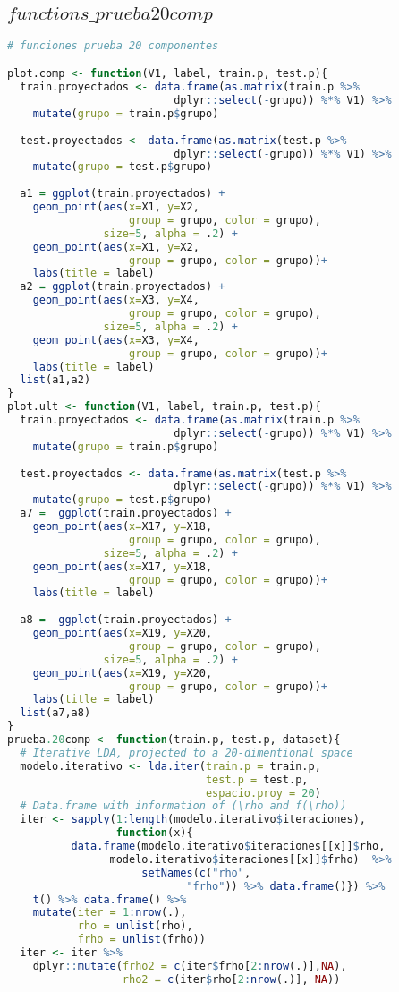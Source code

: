 \subsection{$functions\_prueba20comp$}
\begin{lstlisting}[language=R, basicstyle=\small]
# funciones prueba 20 componentes

plot.comp <- function(V1, label, train.p, test.p){
  train.proyectados <- data.frame(as.matrix(train.p %>% 
                          dplyr::select(-grupo)) %*% V1) %>%
    mutate(grupo = train.p$grupo)
  
  test.proyectados <- data.frame(as.matrix(test.p %>% 
                          dplyr::select(-grupo)) %*% V1) %>%
    mutate(grupo = test.p$grupo)
  
  a1 = ggplot(train.proyectados) + 
    geom_point(aes(x=X1, y=X2, 
                   group = grupo, color = grupo), 
               size=5, alpha = .2) + 
    geom_point(aes(x=X1, y=X2, 
                   group = grupo, color = grupo))+ 
    labs(title = label)
  a2 = ggplot(train.proyectados) + 
    geom_point(aes(x=X3, y=X4, 
                   group = grupo, color = grupo), 
               size=5, alpha = .2) + 
    geom_point(aes(x=X3, y=X4, 
                   group = grupo, color = grupo))+ 
    labs(title = label)
  list(a1,a2)
}
plot.ult <- function(V1, label, train.p, test.p){
  train.proyectados <- data.frame(as.matrix(train.p %>% 
                          dplyr::select(-grupo)) %*% V1) %>%
    mutate(grupo = train.p$grupo)
  
  test.proyectados <- data.frame(as.matrix(test.p %>% 
                          dplyr::select(-grupo)) %*% V1) %>%
    mutate(grupo = test.p$grupo)
  a7 =  ggplot(train.proyectados) + 
    geom_point(aes(x=X17, y=X18, 
                   group = grupo, color = grupo), 
               size=5, alpha = .2) + 
    geom_point(aes(x=X17, y=X18, 
                   group = grupo, color = grupo))+ 
    labs(title = label)
  
  a8 =  ggplot(train.proyectados) + 
    geom_point(aes(x=X19, y=X20, 
                   group = grupo, color = grupo), 
               size=5, alpha = .2) + 
    geom_point(aes(x=X19, y=X20, 
                   group = grupo, color = grupo))+ 
    labs(title = label)
  list(a7,a8)
}
prueba.20comp <- function(train.p, test.p, dataset){
  # Iterative LDA, projected to a 20-dimentional space
  modelo.iterativo <- lda.iter(train.p = train.p, 
                               test.p = test.p,
                               espacio.proy = 20)
  # Data.frame with information of (\rho and f(\rho))
  iter <- sapply(1:length(modelo.iterativo$iteraciones), 
                 function(x){
          data.frame(modelo.iterativo$iteraciones[[x]]$rho,
                modelo.iterativo$iteraciones[[x]]$frho)  %>% 
                     setNames(c("rho", 
                            "frho")) %>% data.frame()}) %>% 
    t() %>% data.frame() %>% 
    mutate(iter = 1:nrow(.), 
           rho = unlist(rho),
           frho = unlist(frho))
  iter <- iter %>% 
    dplyr::mutate(frho2 = c(iter$frho[2:nrow(.)],NA),
                  rho2 = c(iter$rho[2:nrow(.)], NA))
  

\end{lstlisting}

